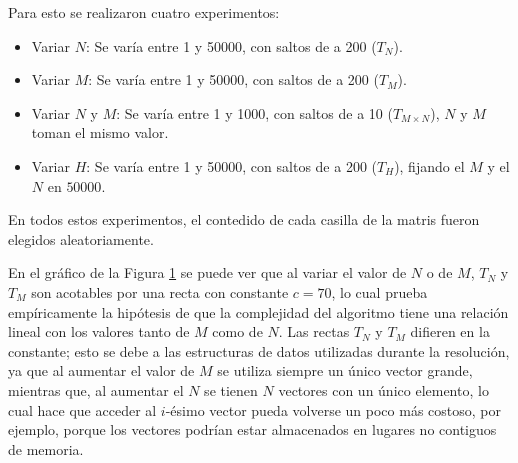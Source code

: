     Para esto se realizaron cuatro experimentos:
    \begin{itemize}
        \item Variar $N$: Se varía entre 1 y 50000, con saltos de a 200 ($T_N$).
        \item Variar $M$: Se varía entre 1 y 50000, con saltos de a 200 ($T_M$).
        \item Variar $N$ y $M$: Se varía entre 1 y 1000, con saltos de a 10 ($T_{M \times N}$), $N$ y $M$ toman el mismo valor.
        \item Variar $H$: Se varía entre 1 y 50000, con saltos de a 200 ($T_H$), fijando el $M$ y el $N$ en $50000$.
    \end{itemize}
    En todos estos experimentos, el contedido de cada casilla de la matris fueron elegidos aleatoriamente.

    \begin{figure}[H]
        \centering
        \caption{}
        \label{fig:exp3:var-nym-base}
    \end{figure}

	En el gráfico de la Figura \ref{fig:exp3:var-nym-base} se puede ver que al
	variar el valor de $N$ o de $M$, $T_N$ y $T_M$ son acotables por una recta
	con constante $c = 70$, lo cual prueba empíricamente la hipótesis de que la
	complejidad del algoritmo tiene una relación lineal con los valores tanto de
	$M$ como de $N$. Las rectas $T_N$ y $T_M$ difieren en la constante; esto se
	debe a las estructuras de datos utilizadas durante la resolución, ya que al
	aumentar el valor de $M$ se utiliza siempre un único vector grande, mientras
	que, al aumentar el $N$ se tienen $N$ vectores con un único elemento, lo
	cual hace que acceder al $i$-ésimo vector pueda volverse un poco más
	costoso, por ejemplo, porque los vectores podrían estar almacenados en
	lugares no contiguos de memoria.


